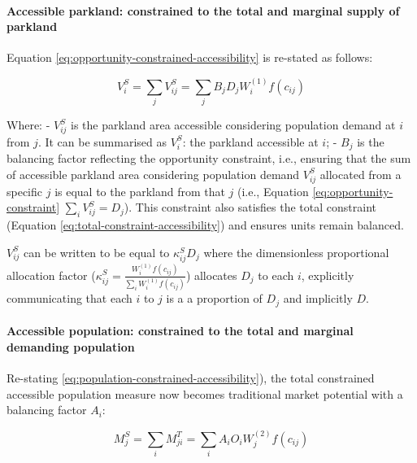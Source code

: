 \documentclass[
11pt, %
oneside, %
english, %
singlespacing, %
]{macthesis} %
\begin{document}
\paragraph{Accessible parkland: constrained to the total and marginal supply of parkland}\label{accessible-parkland-constrained-to-the-total-and-marginal-supply-of-parkland}

Equation \ref{eq:opportunity-constrained-accessibility} is re-stated as follows:

\begin{equation}
\label{eq:opportunity-constrained-accessibility}
V^S_{i} = \sum_j V^S_{ij} = \sum_j B_j D_j W_i^{(1)} f(c_{ij})
\end{equation} 

Where:
- \(V^S_{ij}\) is the parkland area accessible considering population demand at \(i\) from \(j\). It can be summarised as \(V^S_{i}\): the parkland accessible at \(i\);
- \(B_j\) is the balancing factor reflecting the opportunity constraint, i.e., ensuring that the sum of accessible parkland area considering population demand \(V^S_{ij}\) allocated from a specific \(j\) is equal to the parkland from that \(j\) (i.e., Equation \ref{eq:opportunity-constraint} \(\sum_i V^S_{ij} =  D_j\)). This constraint also satisfies the total constraint (Equation \ref{eq:total-constraint-accessibility}) and ensures units remain balanced.

\(V_{ij}^S\) can be written to be equal to \(\kappa_{ij}^S D_j\) where the dimensionless proportional allocation factor (\(\kappa_{ij}^S = \frac{W_i^{(1)} f(c_{ij})}{\sum_i W_i^{(1)} f(c_{ij})}\)) allocates \(D_j\) to each \(i\), explicitly communicating that each \(i\) to \(j\) is a a proportion of \(D_j\) and implicitly \(D\).

\paragraph{Accessible population: constrained to the total and marginal demanding population}\label{accessible-population-constrained-to-the-total-and-marginal-demanding-population}

Re-stating \ref{eq:population-constrained-accessibility}), the total constrained accessible population measure now becomes traditional market potential with a balancing factor \(A_i\):

\begin{equation}
\label{eq:population-constrained-accessibility}
M^S_j = \sum_i M^T_{ji} = \sum_i A_i O_i W_j^{(2)} f(c_{ij})
\end{equation} 
\end{document}
